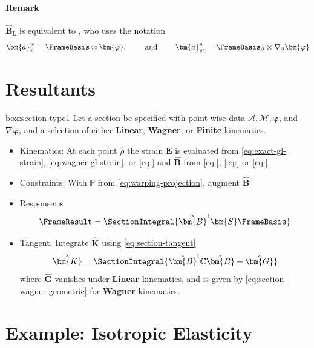 \paragraph{Remark}
\(\hat{\bm{B}}_{\mathrm{L}}\) is equivalent to \cite[Eq. 2.59]{lecorvec2012nonlinear}, who uses the notation
\[
\bm{a}_{x}^w = \FrameBasis \otimes \bm{\varphi},
\qquad\text{ and }\qquad 
\bm{a}_{yz}^w = \FrameBasis_{\beta} \otimes \nabla_{\beta} \bm{\varphi}
\]


\section{Resultants}


\vspace{1ex}
\begin{ambox}[Section]{box:section-type1}
Let a section be specified with point-wise data \(\mathcal{A}, \mathcal{M}, \bm{\varphi}\), and \(\nabla \bm{\varphi}\), and a selection of either \textbf{Linear}, \textbf{Wagner}, or \textbf{Finite} kinematics. 
\begin{itemize}
    \item Kinematics: At each point \(\hat{\rho}\) the strain \(\bm{E}\) is evaluated from \cref{eq:exact-gl-strain}, \cref{eq:wagner-gl-strain}, or \cref{eq:} and \(\hat{\bm{B}}\) from \cref{eq:}, \cref{eq:} or \cref{eq:}

    \item Constraints: With \(\mathbb{P}\) from \cref{eq:warping-projection}, augment \(\hat{\bm{B}}\)

    \item Response: \(\bm{s}\)
    \[
    \FrameResult= \SectionIntegral{\hat{\bm{B}}^{\mathrm{t}} \bm{S}\FrameBasis}
    \]

    \item Tangent: Integrate \(\hat{\bm{K}}\) using \cref{eq:section-tangent}
    \begin{equation*}
    \hat{\bm{K}} = \SectionIntegral{
        \hat{\bm{B}}^{\mathrm{t}} \mathbb{C}\hat{\bm{B}} + \hat{\bm{G}}}
    \end{equation*}
    where \(\hat{\bm{G}}\) vanishes under \textbf{Linear} kinematics, and is given by \cref{eq:section-wagner-geometric} for \textbf{Wagner} kinematics.

\end{itemize}
\end{ambox}

\section{Example: Isotropic Elasticity}


